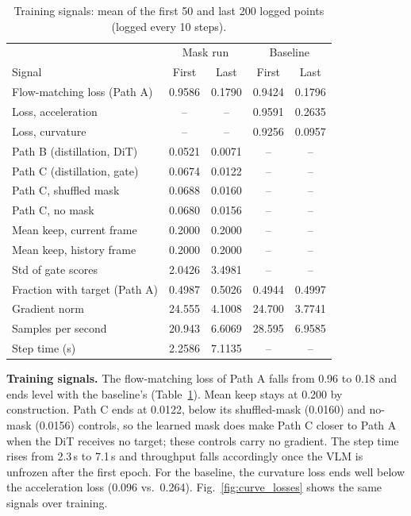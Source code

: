\begin{table}
\centering\scriptsize
\caption{Training signals: mean of the first 50 and last 200 logged points (logged every 10 steps).}
\label{tab:app_train}
\begin{tabular}{@{}lcccc@{}}
\toprule
 & \multicolumn{2}{c}{Mask run} & \multicolumn{2}{c}{Baseline} \\
Signal & First & Last & First & Last \\
\midrule
Flow-matching loss (Path A) & 0.9586 & 0.1790 & 0.9424 & 0.1796 \\
Loss, acceleration & -- & -- & 0.9591 & 0.2635 \\
Loss, curvature & -- & -- & 0.9256 & 0.0957 \\
Path B (distillation, DiT) & 0.0521 & 0.0071 & -- & -- \\
Path C (distillation, gate) & 0.0674 & 0.0122 & -- & -- \\
Path C, shuffled mask & 0.0688 & 0.0160 & -- & -- \\
Path C, no mask & 0.0680 & 0.0156 & -- & -- \\
Mean keep, current frame & 0.2000 & 0.2000 & -- & -- \\
Mean keep, history frame & 0.2000 & 0.2000 & -- & -- \\
Std of gate scores & 2.0426 & 3.4981 & -- & -- \\
Fraction with target (Path A) & 0.4987 & 0.5026 & 0.4944 & 0.4997 \\
Gradient norm & 24.555 & 4.1008 & 24.700 & 3.7741 \\
Samples per second & 20.943 & 6.6069 & 28.595 & 6.9585 \\
Step time (s) & 2.2586 & 7.1135 & -- & -- \\
\bottomrule
\end{tabular}
\end{table}
\textbf{Training signals.} The flow-matching loss of Path A falls from 0.96 to 0.18 and ends level with the baseline's (Table~\ref{tab:app_train}). Mean keep stays at 0.200 by construction. Path C ends at 0.0122, below its shuffled-mask (0.0160) and no-mask (0.0156) controls, so the learned mask does make Path C closer to Path A when the DiT receives no target; these controls carry no gradient. The step time rises from 2.3\,s to 7.1\,s and throughput falls accordingly once the VLM is unfrozen after the first epoch. For the baseline, the curvature loss ends well below the acceleration loss (0.096 vs.\ 0.264). Fig.~\ref{fig:curve_losses} shows the same signals over training.


